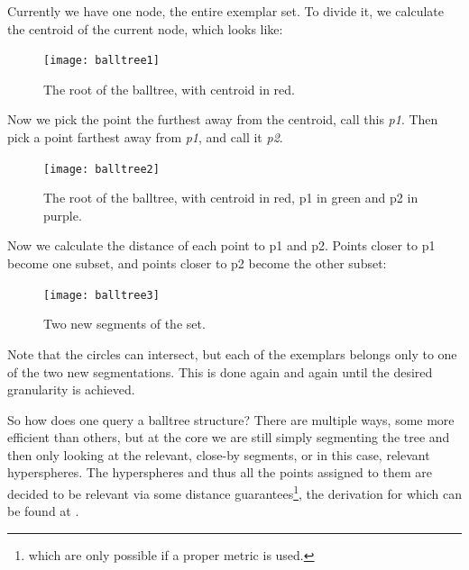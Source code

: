 \documentclass[a4paper, 12pt]{article}
\begin{document}
                    \newpage
                    
                    \par Currently we have one node, the entire exemplar set. To divide it, we calculate the centroid of the current node, which looks like:
                    
                    \begin{figure}[h]
                        \caption{The root of the balltree, with centroid in red.}
                        \centering
                        \texttt{[image: balltree1]}
                    \end{figure}
                    
                    \newpage
                    
                    \par Now we pick the point the furthest away from the centroid, call this \textit{p1}. Then pick a point farthest away from \textit{p1}, and call it \textit{p2}.
                    
                    \begin{figure}[h]
                        \caption{The root of the balltree, with centroid in red, p1 in green and p2 in purple.}
                        \centering
                        \texttt{[image: balltree2]}
                    \end{figure}
                    
                    \newpage
                    
                    Now we calculate the distance of each point to p1 and p2. Points closer to p1 become one subset, and points closer to p2 become the other subset:
                    
                    \begin{figure}[h]
                        \caption{Two new segments of the set.}
                        \centering
                        \texttt{[image: balltree3]}
                    \end{figure}
                    
                    \par Note that the circles can intersect, but each of the exemplars belongs only to one of the two new segmentations. This is done again and again until the desired granularity is achieved. 
                    
                    \par So how does one query a balltree structure? There are multiple ways, some more efficient than others\cite{manyBalltrees}, but at the core we are still simply segmenting the tree and then only looking at the relevant, close-by segments, or in this case, relevant hyperspheres. The hyperspheres and thus all the points assigned to them are decided to be relevant via some distance guarantees\footnote{which are only possible if a proper metric is used.}, the derivation for which can be found at \cite{manyBalltrees}.
                        
\end{document}
